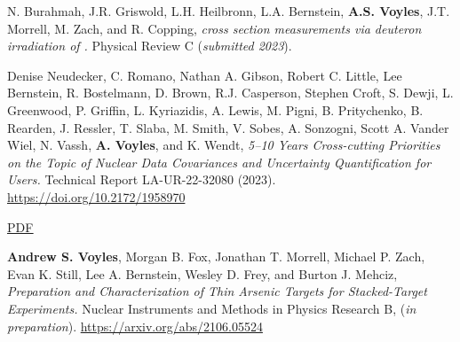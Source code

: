 \begin{bibsection}



\item N. Burahmah, J.R. Griswold, L.H. Heilbronn, L.A. Bernstein,  \textbf{A.S. Voyles}, J.T. Morrell, M. Zach, and R. Copping, \emph{     cross section measurements via deuteron irradiation of  .} Physical Review C  (\emph{submitted 2023}). %



\item Denise Neudecker, C. Romano, Nathan A. Gibson, Robert C. Little, Lee Bernstein, R. Bostelmann, D. Brown, R.J. Casperson, Stephen Croft, S. Dewji, L. Greenwood, P. Griffin, L. Kyriazidis, A. Lewis, M. Pigni, B. Pritychenko, B. Rearden, J. Ressler, T. Slaba, M. Smith, V. Sobes, A. Sonzogni, Scott A. Vander Wiel, N. Vassh, \textbf{A.  Voyles}, and K. Wendt, \emph{5--10 Years Cross-cutting Priorities on the Topic of Nuclear Data Covariances and Uncertainty Quantification for Users.} Technical Report LA-UR-22-32080  (2023). \url{https://doi.org/10.2172/1958970} 

\ifshort \vspace{0.1cm} \href{https://avoyles.github.io/papers/Neudecker2023_UQ_Short.pdf}{\underline{PDF}} \else  \fi 



\item \textbf{Andrew S. Voyles}, Morgan B. Fox, Jonathan T. Morrell, Michael P. Zach, Evan K. Still, Lee A. Bernstein, Wesley D. Frey, and Burton J. Mehciz, \emph{Preparation and Characterization of Thin Arsenic Targets for Stacked-Target Experiments.} Nuclear Instruments and Methods in Physics Research  B,  (\emph{in preparation}). \url{https://arxiv.org/abs/2106.05524} 



\end{bibsection}
